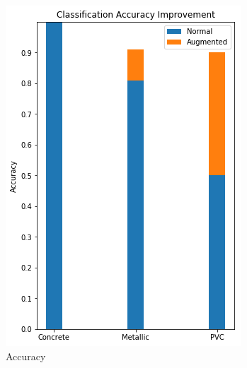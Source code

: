 \begin{figure}[H]
  \centering
  \begin{subfigure}[b]{0.4\linewidth}
    \includegraphics[width=\linewidth]{figures/Time-Accuracy.png}
    \caption{Accuracy}
  \end{subfigure}
  \begin{subfigure}[b]{0.4\linewidth}

\end{subfigure}
\end{figure}
